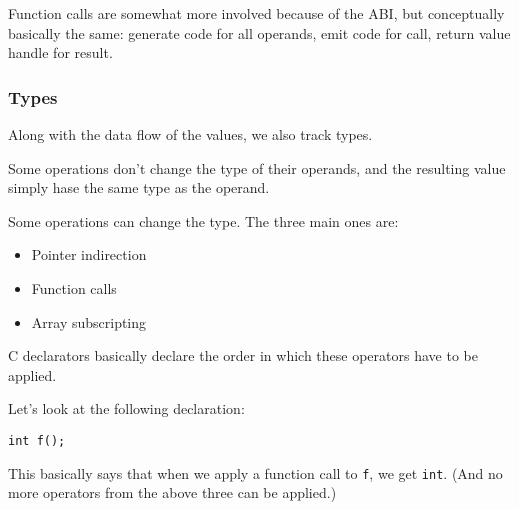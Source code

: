 \documentclass[12pt]{article}
\begin{document}
Function calls are somewhat more involved because of the ABI, but conceptually
basically the same: generate code for all operands, emit code for call, return
value handle for result.


\subsubsection{Types}
\label{sec:types}
Along with the data flow of the values, we also track types.

Some operations don't change the type of their operands, and the resulting
value simply hase the same type as the operand.

Some operations can change the type. The three main ones are:
\begin{itemize}
	\item Pointer indirection
	\item Function calls
	\item Array subscripting
\end{itemize}

C declarators basically declare the order in which these operators have to be
applied.

Let's look at the following declaration:
\begin{center}
\begin{BVerbatim}
int f();
\end{BVerbatim}
\end{center}
This basically says that when we apply a function call to \texttt{f}, we get
\texttt{int}. (And no more operators from the above three can be applied.)
\end{document}
